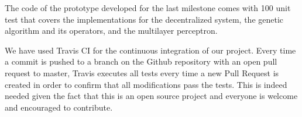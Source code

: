 The code of the prototype developed for the last milestone comes with 100 unit test that covers the implementations for the decentralized system, the genetic algorithm and its operators, and the multilayer perceptron.

We have used Travis CI for the continuous integration of our project. Every time a commit is pushed to a branch on the Github repository with an open pull request to master, Travis executes all tests every time a new Pull Request is created in order to confirm that all modifications pass the tests. This is indeed needed given the fact that this is an open source project and everyone is welcome and encouraged to contribute.
